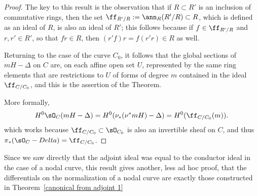 \begin{proof}
The key to this result is the observation that if $R\subset R'$ is an inclusion of commutative rings, then the set
$\ff_{R'/R} := \ann_{R}(R'/R)\subset R$, which is defined as an ideal of $R$, is also an ideal of $R'$; this follows
because if $f\in \ff_{R'/R} $ and $r, r'\in R'$, so that $fr \in R$, then $(r'f)r = f(r'r) \in R$ as well.

Returning to the case of the curve $C_{0}$, it follows that the global sections of $mH -\Delta$ on $C$
are, on each affine open set $U$, represented by the same ring elements that  are restrictions to $U$
of forms of degree $m$ contained in 
the ideal $\ff_{C/C_{0}}$, and this is the assertion of the Theorem. 

More formally, 
$$
H^{0}\sO_{C}(mH-\Delta) =H^{0}(\nu_{*}(\nu^{*}mH)-\Delta) = H^{0}(\ff_{ C/C_{0}}(m)).
$$
which works because $\ff_{ C/C_{0}}\subset \sO_{C_{0}}$ is also an invertible sheaf on $C$, and
thus $\pi_{*}(\sO_{C}-Delta) =  \ff_{ C/C_{0}}$.
\end{proof}

Since we saw directly that the adjoint ideal was equal to the conductor ideal in the case of
a nodal curve, this result gives another, less ad hoc proof, that the differentials on the normalization of a nodal curve
are exactly those constructed in Theorem~\ref{canonical from adjoint 1}

